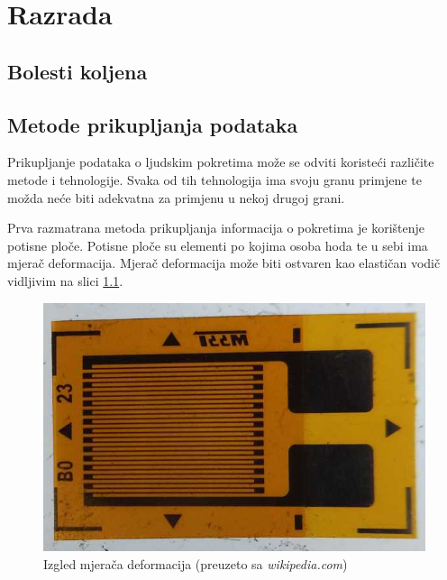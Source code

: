 \documentclass[times, utf8, diplomski]{fer}
\begin{document}
\chapter{Razrada}

\section{Bolesti koljena}

\section{Metode prikupljanja podataka}
Prikupljanje podataka o ljudskim pokretima može se odviti koristeći različite metode i tehnologije.
Svaka od tih tehnologija ima svoju granu primjene te možda neće biti adekvatna za primjenu u nekoj drugoj grani.

Prva razmatrana metoda prikupljanja informacija o pokretima je korištenje potisne ploče. Potisne ploče su elementi po kojima osoba
hoda te u sebi ima mjerač deformacija. Mjerač deformacija može biti ostvaren kao elastičan vodič vidljivim na slici \ref{defgag}. 

\begin{figure}[h!]
    \includegraphics[width=\textwidth]{strain_gauge.jpg}
    \caption{Izgled mjerača deformacija (preuzeto sa \textit{wikipedia.com})}
    \label{defgag}
\end{figure}
\end{document}
